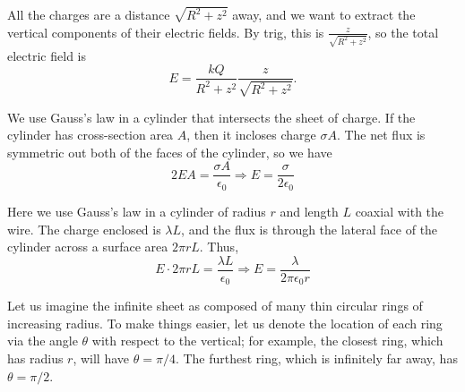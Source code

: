 \documentclass[11pt]{scrartcl}
\begin{document}
\begin{alphasol}
    \item All the charges are a distance $\sqrt{R^2 + z^2}$ away, and we want to extract the vertical components of their electric fields. By trig, this is $\frac{z}{\sqrt{R^2 + z^2}}$, so the total electric field is
    $$E = \frac{kQ}{R^2 + z^2}\frac{z}{\sqrt{R^2+z^2}}.$$
    \item We use Gauss's law in a cylinder that intersects the sheet of charge. If the cylinder has cross-section area $A$, then it incloses charge $\sigma A$. The net flux is symmetric out both of the faces of the cylinder, so we have $$2EA=\frac{\sigma A}{\epsilon_0}\Longrightarrow E=\frac{\sigma}{2\epsilon_0}$$
    \item Here we use Gauss's law in a cylinder of radius $r$ and length $L$ coaxial with the wire. The charge enclosed is $\lambda L$, and the flux is through the lateral face of the cylinder across a surface area $2\pi rL$. Thus, $$E\cdot 2\pi rL = \frac{\lambda L}{\epsilon_0}\Longrightarrow E = \frac{\lambda}{2\pi \epsilon_0 r}$$
    \item Let us imagine the infinite sheet as composed of many thin circular rings of increasing radius. To make things easier, let us denote the location of each ring via the angle $\theta$ with respect to the vertical; for example, the closest ring, which has radius $r$, will have $\theta = \pi/4$. The furthest ring, which is infinitely far away, has $\theta = \pi/2$. 


\end{alphasol}
\end{document}
